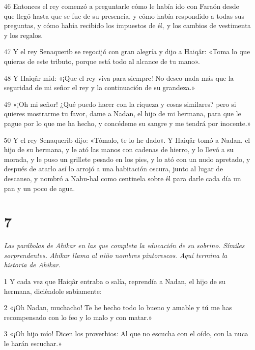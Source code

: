 \par 46 Entonces el rey comenzó a preguntarle cómo le había ido con Faraón desde que llegó hasta que se fue de su presencia, y cómo había respondido a todas sus preguntas, y cómo había recibido los impuestos de él, y los cambios de vestimenta y los regalos.

\par 47 Y el rey Senaquerib se regocijó con gran alegría y dijo a Haiqâr: «Toma lo que quieras de este tributo, porque está todo al alcance de tu mano».

\par 48 Y Haiqâr mid: «¡Que el rey viva para siempre! No deseo nada más que la seguridad de mi señor el rey y la continuación de su grandeza.»

\par 49 «¡Oh mi señor! ¿Qué puedo hacer con la riqueza y cosas similares? pero si quieres mostrarme tu favor, dame a Nadan, el hijo de mi hermana, para que le pague por lo que me ha hecho, y concédeme su sangre y me tendrá por inocente.»

\par 50 Y el rey Senaquerib dijo: «Tómalo, te lo he dado». Y Haiqâr tomó a Nadan, el hijo de su hermana, y le ató las manos con cadenas de hierro, y lo llevó a su morada, y le puso un grillete pesado en los pies, y lo ató con un nudo apretado, y después de atarlo así lo arrojó a una habitación oscura, junto al lugar de descanso, y nombró a Nabu-hal como centinela sobre él para darle cada día un pan y un poco de agua.

\chapter{7}

\par \textit{Las parábolas de Ahikar en las que completa la educación de su sobrino. Símiles sorprendentes. Ahikar llama al niño nombres pintorescos. Aquí termina la historia de Ahikar.}

\par 1 Y cada vez que Haiqâr entraba o salía, reprendía a Nadan, el hijo de su hermana, diciéndole sabiamente:

\par 2 «¡Oh Nadan, muchacho! Te he hecho todo lo bueno y amable y tú me has recompensado con lo feo y lo malo y con matar.»

\par 3 «¡Oh hijo mío! Dicen los proverbios: Al que no escucha con el oído, con la nuca le harán escuchar.»

